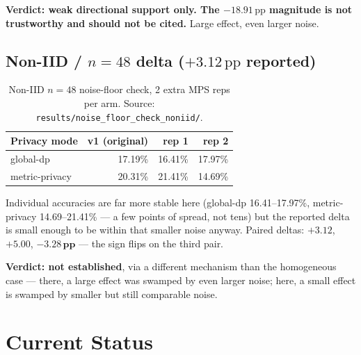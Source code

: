 \documentclass[11pt]{article}
\newcommand{\code}[1]{\texttt{#1}}
\newcommand{\pp}{\,\text{pp}}
\begin{document}
\textbf{Verdict: weak directional support only. The $-18.91\pp$ magnitude is not trustworthy and
should not be cited.} Large effect, even larger noise.

\subsection{Non-IID / $n{=}48$ delta ($+3.12\pp$ reported)}

\begin{table}[h]
\centering
\small
\begin{tabular}{lrrr}
\toprule
Privacy mode & v1 (original) & rep 1 & rep 2 \\
\midrule
global-dp        & 17.19\% & 16.41\% & 17.97\% \\
metric-privacy   & 20.31\% & 21.41\% & 14.69\% \\
\bottomrule
\end{tabular}
\caption{Non-IID $n{=}48$ noise-floor check, 2 extra MPS reps per arm.
Source: \code{results/noise\_floor\_check\_noniid/}.}
\label{tab:noisefloor-niid}
\end{table}

Individual accuracies are far more stable here (global-dp 16.41--17.97\%, metric-privacy
14.69--21.41\% --- a few points of spread, not tens) but the reported delta is small enough to be
within that smaller noise anyway. Paired deltas: $+3.12$, $+5.00$, $\mathbf{-3.28\pp}$ --- the sign
flips on the third pair.

\textbf{Verdict: not established}, via a different mechanism than the homogeneous case --- there, a
large effect was swamped by even larger noise; here, a small effect is swamped by smaller but still
comparable noise.

\section{Current Status}
\label{sec:status}
\end{document}
